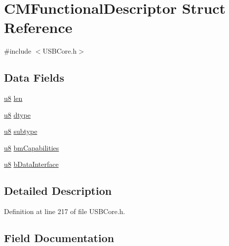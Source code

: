 \hypertarget{struct_c_m_functional_descriptor}{}\section{C\+M\+Functional\+Descriptor Struct Reference}
\label{struct_c_m_functional_descriptor}


{\ttfamily \#include $<$U\+S\+B\+Core.\+h$>$}

\subsection*{Data Fields}
\begin{DoxyCompactItemize}
\item 
\hyperlink{_u_s_b_a_p_i_8h_aed742c436da53c1080638ce6ef7d13de}{u8} \hyperlink{struct_c_m_functional_descriptor_afbf3f3230446569534d5f466aaf4c23b}{len}
\item 
\hyperlink{_u_s_b_a_p_i_8h_aed742c436da53c1080638ce6ef7d13de}{u8} \hyperlink{struct_c_m_functional_descriptor_a0bb419531ec75697e63e9109fecf81b0}{dtype}
\item 
\hyperlink{_u_s_b_a_p_i_8h_aed742c436da53c1080638ce6ef7d13de}{u8} \hyperlink{struct_c_m_functional_descriptor_afb82dd1313bc5284e4e5aef8218ef414}{subtype}
\item 
\hyperlink{_u_s_b_a_p_i_8h_aed742c436da53c1080638ce6ef7d13de}{u8} \hyperlink{struct_c_m_functional_descriptor_a9ad7ca27543639baeed1b53c6f24e149}{bm\+Capabilities}
\item 
\hyperlink{_u_s_b_a_p_i_8h_aed742c436da53c1080638ce6ef7d13de}{u8} \hyperlink{struct_c_m_functional_descriptor_a856be28e5decda9135c9b148a4897716}{b\+Data\+Interface}
\end{DoxyCompactItemize}


\subsection{Detailed Description}


Definition at line 217 of file U\+S\+B\+Core.\+h.



\subsection{Field Documentation}
\hypertarget{struct_c_m_functional_descriptor_a856be28e5decda9135c9b148a4897716}{}
